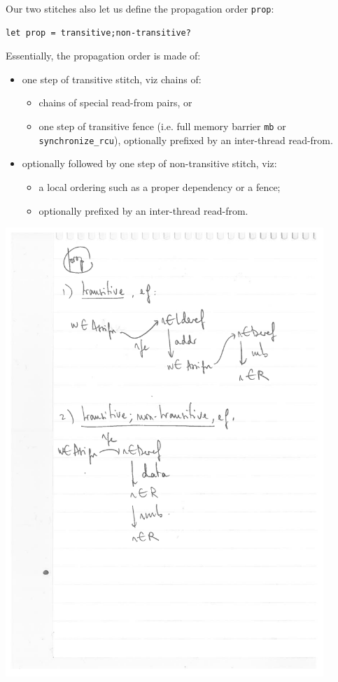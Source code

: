 \documentclass[a4paper]{article}
\begin{document}
Our two stitches also let us define the propagation order {\tt prop}:
\begin{verbatim}
let prop = transitive;non-transitive?
\end{verbatim}

\noindent Essentially, the propagation order is made of:
\begin{itemize}
\item one step of transitive stitch, viz chains of:
  \begin{itemize}
  \item chains of special read-from pairs, or
  \item one step of transitive fence (i.e. full memory barrier {\tt mb} or {\tt
synchronize\_rcu}), optionally prefixed by an inter-thread read-from.
  \end{itemize}
\item optionally followed by one step of non-transitive stitch, viz:
  \begin{itemize}
  \item a local ordering such as a proper dependency or a fence;
  \item optionally prefixed by an inter-thread read-from.
  \end{itemize}
\end{itemize}

\includegraphics[width=12cm]{prop}
\end{document}
